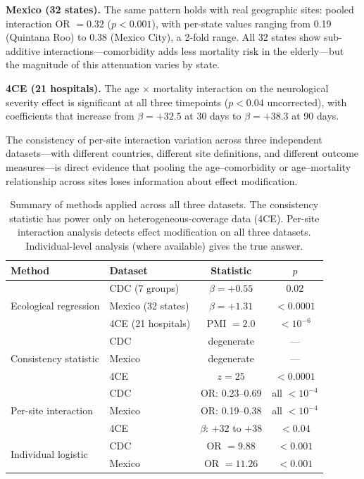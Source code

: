 \documentclass[11pt]{article}
\begin{document}
\textbf{Mexico (32 states).}  The same pattern holds with real geographic
sites: pooled interaction OR $= 0.32$ ($p < 0.001$), with per-state
values ranging from 0.19 (Quintana Roo) to 0.38 (Mexico City), a 2-fold
range.  All 32 states show sub-additive interactions---comorbidity adds
less mortality risk in the elderly---but the magnitude of this attenuation
varies by state.

\textbf{4CE (21 hospitals).}  The age $\times$ mortality interaction on the
neurological severity effect is significant at all three timepoints
($p < 0.04$ uncorrected), with coefficients that increase from
$\beta = +32.5$ at 30 days to $\beta = +38.3$ at 90 days.

The consistency of per-site interaction variation across three independent
datasets---with different countries, different site definitions, and
different outcome measures---is direct evidence that pooling the
age--comorbidity or age--mortality relationship across sites loses
information about effect modification.

\begin{table}[t]
\centering
\caption{Summary of methods applied across all three datasets.  The
consistency statistic has power only on heterogeneous-coverage data (4CE).
Per-site interaction analysis detects effect modification on all three
datasets.  Individual-level analysis (where available) gives the true
answer.}
\label{tab:comparison}
\begin{tabular}{llcc}
\toprule
Method & Dataset & Statistic & $p$ \\
\midrule
\multirow{3}{*}{Ecological regression}
  & CDC (7 groups) & $\beta = +0.55$ & 0.02 \\
  & Mexico (32 states) & $\beta = +1.31$ & $< 0.0001$ \\
  & 4CE (21 hospitals) & PMI $= 2.0$ & $< 10^{-6}$ \\
\midrule
\multirow{3}{*}{Consistency statistic}
  & CDC & degenerate & --- \\
  & Mexico & degenerate & --- \\
  & 4CE & $z = 25$ & $< 0.0001$ \\
\midrule
\multirow{3}{*}{Per-site interaction}
  & CDC & OR: 0.23--0.69 & all $< 10^{-4}$ \\
  & Mexico & OR: 0.19--0.38 & all $< 10^{-4}$ \\
  & 4CE & $\beta$: $+32$ to $+38$ & $< 0.04$ \\
\midrule
\multirow{2}{*}{Individual logistic}
  & CDC & OR $= 9.88$ & $< 0.001$ \\
  & Mexico & OR $= 11.26$ & $< 0.001$ \\
\bottomrule
\end{tabular}
\end{table}
\end{document}

